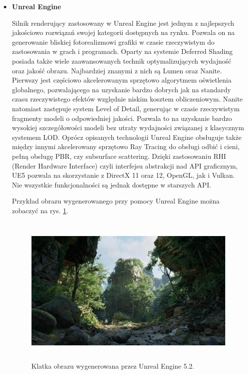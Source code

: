 \begin{itemize}
	\vfill
	\clearpage

	\item \textbf{Unreal Engine}
	
	Silnik renderujący zastosowany w Unreal Engine jest jednym z najlepszych jakościowo rozwiązań swojej kategorii dostępnych na rynku. Pozwala on na generowanie bliskiej fotorealizmowi grafiki w czasie rzeczywistym do zastosowania w grach i programach. Oparty na systemie Deferred Shading posiada także wiele zaawansowanych technik optymalizujących wydajność oraz jakość obrazu. Najbardziej znanymi z nich są Lumen oraz Nanite. Pierwszy jest częściowo akcelerowanym sprzętowo algorytmem oświetlenia globalnego, pozwalającego na uzyskanie bardzo dobrych jak na standardy czasu rzeczywistego efektów względnie niskim kosztem obliczeniowym. Nanite natomiast zastępuje system Level of Detail, generując w czasie rzeczywistym fragmenty modeli o odpowiedniej jakości. Pozwala to na uzyskanie bardzo wysokiej szczegółowości modeli bez utraty wydajności związanej z klasycznym systemem LOD. Oprócz opisanych technologii Unreal Engine obsługuje także między innymi akcelerowany sprzętowo Ray Tracing do obsługi odbić i cieni, pełną obsługę PBR, czy subsurface scattering. Dzięki zastosowaniu RHI (Render Hardware Interface) czyli interfejsu abstrakcji nad API graficznym, UE5 pozwala na skorzystanie z DirectX 11 oraz 12, OpenGL, jak i Vulkan. Nie wszystkie funkcjonalności są jednak dostępne w starszych API. 
	
	Przykład obrazu wygenerowanego przy pomocy Unreal Engine można zobaczyć na rys. \ref{intro-unreal-engine}.

	\begin{figure}[htbp]
		\centering
		\includegraphics[width=5.21482in,height=2.93333in]{images/17_Unreal_engine_5_2.jpg}
		\caption{Klatka obrazu wygenerowana przez Unreal Engine 5.2.}
		\label{intro-unreal-engine}
	\end{figure}


\end{itemize}
